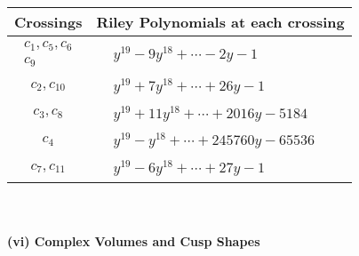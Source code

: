 \documentclass[1p]{elsarticle_modified}
\theoremstyle{definition}
\begin{document}
\begin{tabular}{m{50pt}|m{274pt}}
Crossings & \hspace{64pt}Riley Polynomials at each crossing \\
\hline $$\begin{aligned}c_{1},c_{5},c_{6}\\c_{9}\end{aligned}$$&$\begin{aligned}
&y^{19}-9 y^{18}+\cdots-2 y-1
\end{aligned}$\\
\hline $$\begin{aligned}c_{2},c_{10}\end{aligned}$$&$\begin{aligned}
&y^{19}+7 y^{18}+\cdots+26 y-1
\end{aligned}$\\
\hline $$\begin{aligned}c_{3},c_{8}\end{aligned}$$&$\begin{aligned}
&y^{19}+11 y^{18}+\cdots+2016 y-5184
\end{aligned}$\\
\hline $$\begin{aligned}c_{4}\end{aligned}$$&$\begin{aligned}
&y^{19}- y^{18}+\cdots+245760 y-65536
\end{aligned}$\\
\hline $$\begin{aligned}c_{7},c_{11}\end{aligned}$$&$\begin{aligned}
&y^{19}-6 y^{18}+\cdots+27 y-1
\end{aligned}$\\
\hline
\end{tabular}\\~\\
\newpage\flushleft \textbf{(vi) Complex Volumes and Cusp Shapes}
\end{document}
